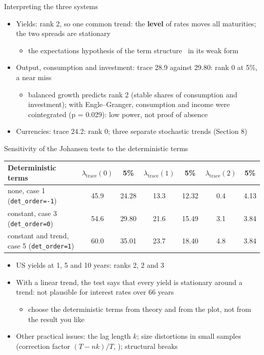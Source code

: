 \begin{frame}{Interpreting the three systems}
\itemsize{\small}
\begin{itemize}
    \item Yields: rank 2, so one common trend: the \textbf{level} of rates moves all maturities; the two spreads are stationary
    \begin{itemize}
        \item the expectations hypothesis of the term structure \ in its weak form
    \end{itemize}
    \item Output, consumption and investment: trace 28.9 against 29.80: rank 0 at 5\%, a near miss
    \begin{itemize}
        \item balanced growth predicts rank 2 (stable shares of consumption and investment); with Engle--Granger, consumption and income were cointegrated (p = 0.029): low power, not proof of absence
    \end{itemize}
    \item Currencies: trace 24.2: rank 0; three separate stochastic trends (Section 8)
\end{itemize}
\end{frame}

\begin{frame}{Sensitivity of the Johansen tests to the deterministic terms}
\itemsize{\small}
\begin{center}
\scriptsize
\begin{tabular}{lcccccc}
\toprule
\textbf{Deterministic terms} & $\lambda_{\mathrm{trace}}(0)$ & 5\% & $\lambda_{\mathrm{trace}}(1)$ & 5\% & $\lambda_{\mathrm{trace}}(2)$ & 5\% \\
\midrule
none, case 1 (\texttt{det\_order=-1}) & 45.9 & 24.28 & 13.3 & 12.32 & 0.4 & 4.13 \\
constant, case 3 (\texttt{det\_order=0}) & 54.6 & 29.80 & 21.6 & 15.49 & 3.1 & 3.84 \\
constant and trend, case 5 (\texttt{det\_order=1}) & 60.0 & 35.01 & 23.7 & 18.40 & 4.8 & 3.84 \\
\bottomrule
\end{tabular}
\end{center}
\begin{itemize}
    \item US yields at 1, 5 and 10 years: ranks 2, 2 and 3
    \item With a linear trend, the test says that every yield is stationary around a trend: not plausible for interest rates over 66 years
    \begin{itemize}
        \item choose the deterministic terms from theory and from the plot, not from the result you like
    \end{itemize}
    \item Other practical issues: the lag length $k$; size distortions in small samples (correction factor $(T - nk)/T$, ); structural breaks
\end{itemize}
\end{frame}

